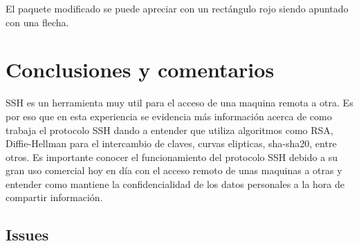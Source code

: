 \documentclass[letter,12pt]{article}
\begin{document}
\begin{enumerate}
El paquete modificado se puede apreciar con un rectángulo rojo siendo apuntado con una flecha.

\end{enumerate}

\clearpage

\section*{Conclusiones y comentarios}

SSH es un herramienta muy util para el acceso de una maquina remota a otra. Es por eso que en esta experiencia se evidencia más información acerca de como trabaja el protocolo SSH dando a entender que utiliza algoritmos como RSA, Diffie-Hellman para el intercambio de claves, curvas elipticas, sha-sha20, entre otros. Es importante conocer el funcionamiento del protocolo SSH debido a su gran uso comercial hoy en día con el acceso remoto de unas maquinas a otras y entender como mantiene la confidencialidad de los datos personales a la hora de compartir información.

\subsection*{Issues}
\end{document}
